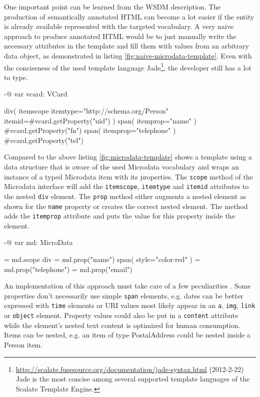 \documentclass[11pt,a4paper,headsepline,twoside]{scrartcl}		%
\newcommand{\citeurl}[2]{\url{#1} (#2)}
\begin{document}
One important point can be learned from the WSDM description. The production of
semantically annotated HTML can become a lot easier if the entity is already
available represented with the targeted vocabulary. A very naive approach to
produce annotated HTML would be to just manually write the necessary attributes
in the template and fill them with values from an arbitrary data object, as
demonstrated in listing \ref{fig:naive-microdata-template}. Even with the
conciseness of the used template language
Jade\footnote{\citeurl{http://scalate.fusesource.org/documentation/jade-syntax.html}{2012-2-22}
  Jade is the most concise among several supported template languages of the
  Scalate Template Engine.}, the developer still has a lot to type.

\begin{anylisting}[label=fig:naive-microdata-template,
                   caption={Defining all Microdata attributes manually in an HTML template}]
-@ var vcard: VCard

div( itemscope itemtype="http://schema.org/Person" 
     itemid=#{vcard.getProperty("uid")} )
  span( itemprop="name" )
    #{vcard.getProperty("fn")}
  span( itemprop="telephone" ) 
    #{vcard.getProperty("tel")}
\end{anylisting}

Compared to the above listing \ref{fig:microdata-template} shows a template
using a data structure that is aware of the used Microdata vocabulary and wraps
an instance of a typed Microdata item with its properties. The
\lstinline:scope: method of the Microdata interface will add the
\lstinline:itemscope:, \lstinline:itemtype: and \lstinline:itemid: attributes to
the nested \lstinline:div: element. The \lstinline:prop: method either augments
a nested element as shown for the \lstinline:name: property or creates the
correct nested element. The method adds the \lstinline:itemprop: attribute and
puts the value for this property inside the element.

\begin{anylisting}[label=fig:microdata-template,
                   caption={Using a Microdata-aware data structure in a template}]
-@ var md: MicroData

= md.scope
  div
    = md.prop("name")
      span( style="color:red" )
    = md.prop("telephone")
    = md.prop("email")
\end{anylisting}

An implementation of this approach must take care of a few
peculiarities \cite{Hickson2011}. Some properties don't necessarily use simple
\lstinline:span: elements, e.g. dates can be better expressed with
\lstinline:time: elements or URI values most likely appear in an
\lstinline:a:, \lstinline:img:, \lstinline:link: or \lstinline:object:
element. Property values could also be put in a \lstinline:content: attribute
while the element's nested text content is optimized for human
consumption. Items can be nested, e.g. an item of type PostalAddress could be
nested inside a Person item.
\end{document}
